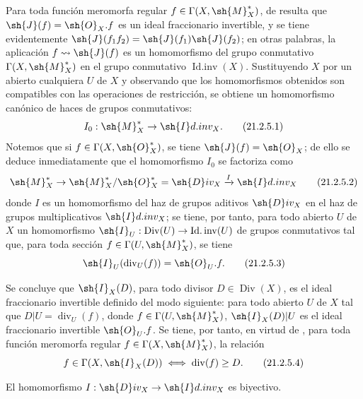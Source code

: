 \begin{env}[21.2.5]
\label{IV.21.2.5}
Para toda función meromorfa regular $f\in\Gamma(X,\sh{M}_X^*)$, de  resulta que $\sh{J}(f)=\sh{O}_X.f$ es un ideal fraccionario invertible, y se tiene evidentemente $\sh{J}(f_1f_2)=\sh{J}(f_1)\sh{J}(f_2)$; en otras palabras, la aplicación $f\leadsto\sh{J}(f)$ es un homomorfismo del grupo conmutativo $\Gamma(X,\sh{M}_X^*)$ en el grupo conmutativo $\operatorname{Id.inv}(X)$.
Sustituyendo $X$ por un abierto cualquiera $U$ de $X$ y observando que los homomorfismos obtenidos son compatibles con las operaciones de restricción, se obtiene un homomorfismo canónico de haces de grupos conmutativos:
\[
\label{IV.21.2.5.1}
  I_0:\sh{M}_X^*\to\sh{I}d.inv_X.
  \tag{21.2.5.1}
\]
Notemos que si $f\in\Gamma(X,\sh{O}_X^*)$, se tiene $\sh{J}(f)=\sh{O}_X$;
de ello se deduce inmediatamente que el homomorfismo $I_0$ se factoriza como
\[
\label{IV.21.2.5.2}
  \sh{M}_X^*\to\sh{M}_X^*/\sh{O}_X^*=\sh{D}iv_X\xrightarrow{I}\sh{I}d.inv_X
  \tag{21.2.5.2}
\]
donde $I$ es un homomorfismo del haz de grupos aditivos $\sh{D}iv_X$ en el haz de grupos multiplicativos $\sh{I}d.inv_X$;
se tiene, por tanto, para todo abierto $U$ de $X$ un homomorfismo $\sh{I}_U:\operatorname{Div}(U)\to\operatorname{Id.inv}(U)$ de grupos conmutativos tal que, para toda sección $f\in\Gamma(U,\sh{M}_X^*)$, se tiene
\[
\label{IV.21.2.5.3}
  \sh{I}_U(\operatorname{div}_U(f))=\sh{O}_U.f.
  \tag{21.2.5.3}
\]


Se concluye que $\sh{I}_X(D)$, para todo divisor $D\in\operatorname{Div}(X)$, es el ideal fraccionario invertible definido del modo siguiente: para todo abierto $U$ de $X$ tal que $D|U=\operatorname{div}_U(f)$, donde $f\in\Gamma(U,\sh{M}_X^*)$, $\sh{I}_X(D)|U$ es el ideal fraccionario invertible $\sh{O}_U.f$.
Se tiene, por tanto, en virtud de , para toda función meromorfa regular $f\in\Gamma(X,\sh{M}_X^*)$, la relación
\[
\label{IV.21.2.5.4}
  f\in\Gamma(X,\sh{I}_X(D)) \iff \operatorname{div}(f)\geq D.
  \tag{21.2.5.4}
\]
\end{env}

\begin{proposition}[21.2.6]
\label{IV.21.2.6}
El homomorfismo $I:\sh{D}iv_X\to\sh{I}d.inv_X$ es biyectivo.
\end{proposition}

